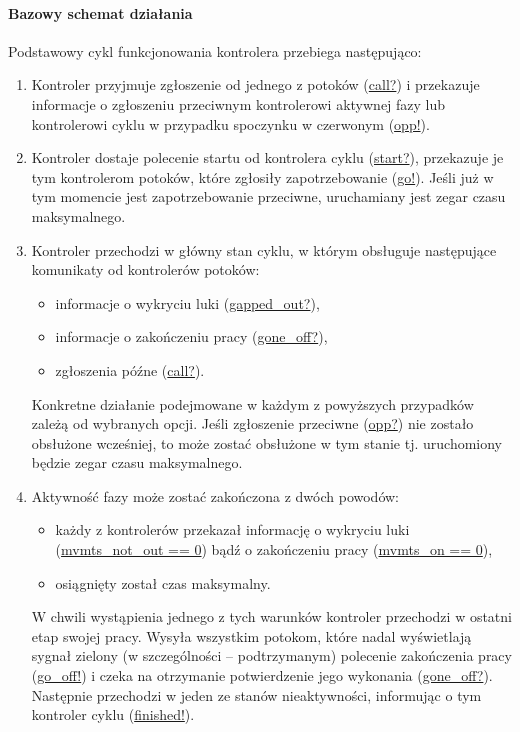 \documentclass{pracamgr}
\theoremstyle{plain}
\begin{document}
\paragraph{Bazowy schemat działania} Podstawowy cykl funkcjonowania
kontrolera przebiega następująco:
\begin{enumerate}
  \item Kontroler przyjmuje zgłoszenie od jednego z potoków (\url{call?}) i
  przekazuje informacje o zgłoszeniu przeciwnym kontrolerowi aktywnej
  fazy lub kontrolerowi cyklu w przypadku spoczynku w czerwonym (\url{opp!}).
  \item Kontroler dostaje polecenie startu od kontrolera cyklu
  (\url{start?}), przekazuje je tym kontrolerom potoków, które
  zgłosiły zapotrzebowanie (\url{go!}). Jeśli już w tym momencie jest
  zapotrzebowanie przeciwne, uruchamiany jest zegar czasu
  maksymalnego.
  \item Kontroler przechodzi w główny stan cyklu, w którym obsługuje
  następujące komunikaty od kontrolerów potoków:
  \begin{itemize}
    \item informacje o wykryciu luki (\url{gapped_out?}),
    \item informacje o zakończeniu pracy (\url{gone_off?}),
    \item zgłoszenia późne (\url{call?}).
  \end{itemize}
  Konkretne działanie podejmowane w każdym z powyższych przypadków
  zależą od wybranych opcji. Jeśli zgłoszenie przeciwne
  (\url{opp?}) nie zostało obsłużone wcześniej, to może zostać
  obsłużone w tym stanie tj. uruchomiony będzie zegar czasu
  maksymalnego.
  \item Aktywność fazy może zostać zakończona z dwóch powodów:
  \begin{itemize}
    \item każdy z kontrolerów przekazał informację o wykryciu luki
    (\url{mvmts_not_out == 0}) bądź o zakończeniu pracy
    (\url{mvmts_on == 0}),
    \item osiągnięty został czas maksymalny.
  \end{itemize}
  W chwili wystąpienia jednego z tych warunków kontroler przechodzi w
  ostatni etap swojej pracy. Wysyła wszystkim potokom, które nadal
  wyświetlają sygnał zielony (w szczególności -- podtrzymanym)
  polecenie zakończenia pracy (\url{go_off!}) i czeka na otrzymanie
  potwierdzenie jego wykonania (\url{gone_off?}). Następnie przechodzi
  w jeden ze stanów nieaktywności, informując o tym kontroler cyklu
  (\url{finished!}).
\end{enumerate}
\end{document}
